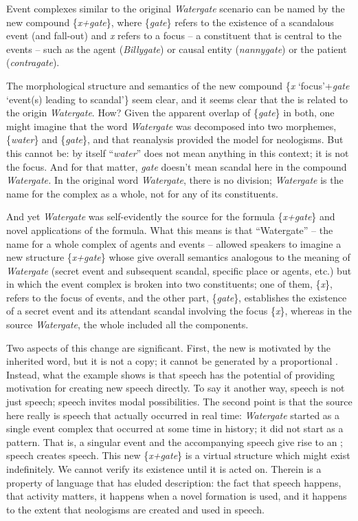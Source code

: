 \documentclass[output=paper,
modfonts
]{LSP/langsci}
\begin{document}
Event complexes similar to the original \emph{Watergate} scenario can be
named by the new compound \{\emph{x+gate}\}, where \{\emph{gate}\}
refers to the existence of a scandalous event (and fall-out) and
\emph{x} refers to a focus -- a constituent that is central to the
events -- such as the agent (\emph{Billygate}) or causal entity
(\emph{nannygate}) or the patient (\emph{contragate}).

The morphological structure and semantics of the new compound \{\emph{x}
`focus'+\emph{gate} `event(s) leading to scandal'\} seem clear, and it
seems clear that the  is related to the origin \emph{Watergate}.
How? Given the apparent overlap of \{\emph{gate}\} in both, one might
imagine that the word \emph{Watergate} was decomposed into two
morphemes, \{\emph{water}\} and \{\emph{gate}\}, and that reanalysis
provided the model for neologisms. But this cannot be: by itself
``\emph{water}'' does not mean anything in this context; it is not the
focus. And for that matter, \emph{gate} doesn't mean scandal here in
the compound \emph{Watergate.} In the original word \emph{Watergate},
there is no division; \emph{Watergate} is the name for the complex as a
whole, not for any of its constituents.

And yet \emph{Watergate} was self-evidently the source for the formula
\{\emph{x+gate}\} and novel applications of the formula. What this means
is that ``Watergate'' -- the name for a whole complex of agents and
events -- allowed speakers to imagine a new structure \{\emph{x+gate}\}
whose  give overall semantics analogous to the meaning of
\emph{Watergate} (secret event and subsequent scandal, specific place or
agents, etc.) but in which the event complex is broken into two
constituents; one of them, \{\emph{x}\}, refers to the focus of events,
and the other part, \{\emph{gate}\}, establishes the existence of a
secret event and its attendant scandal involving the focus \{\emph{x}\},
whereas in the source \emph{Watergate}, the whole included all the
components.

Two aspects of this change are significant. First, the new  is
motivated by the inherited word, but it is not a copy; it cannot be
generated by a proportional . Instead, what the example shows is
that speech has the potential of providing motivation for creating new
speech directly. To say it another way, speech is not just speech;
speech invites modal possibilities. The second point is that the source
here really is speech that actually occurred in real time:
\emph{Watergate} started as a single event complex that occurred at some
time in history; it did not start as a pattern. That is, a singular
event and the accompanying speech give rise to an ; speech
creates speech. This new \{\emph{x+gate}\} is a virtual structure which
might exist indefinitely. We cannot verify its existence until it is
acted on. Therein is a property of language that has eluded description:
the fact that speech happens, that activity matters, it happens when a
novel formation is used, and it happens to the extent that neologisms
are created and used in speech.
\end{document}

